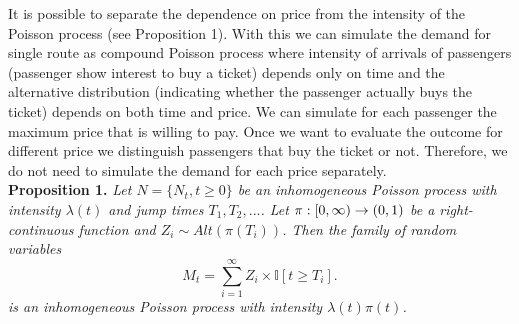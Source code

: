 It is possible to separate the dependence on price from the intensity of the Poisson process (see Proposition 1). With this we can simulate the demand for single route as compound Poisson process where intensity of arrivals of passengers (passenger show interest to buy a ticket) depends only on time and the alternative distribution (indicating whether the passenger actually buys the ticket) depends on both time and price. We can simulate for each passenger the maximum price that is willing to pay. Once we want to evaluate the outcome for different price we distinguish passengers that buy the ticket or not. Therefore, we do not need to simulate the demand for each price separately. \\

\textbf{Proposition 1.}
\emph{
		Let $N = \{N_t, t \geq 0\}$ be an inhomogeneous Poisson process with intensity $\lambda(t)$ and jump times $T_1, T_2, ...$. Let $\pi: [0, \infty) \to (0,1)$ be a right-continuous function and $Z_i \sim Alt(\pi(T_i))$. Then the family of random variables
		\[
			M_t = \sum_{i=1}^{\infty} Z_i \times \mathbb{I} [t \geq T_i].
		\]
		is an inhomogeneous Poisson process with intensity $\lambda(t) \pi(t)$.
}
